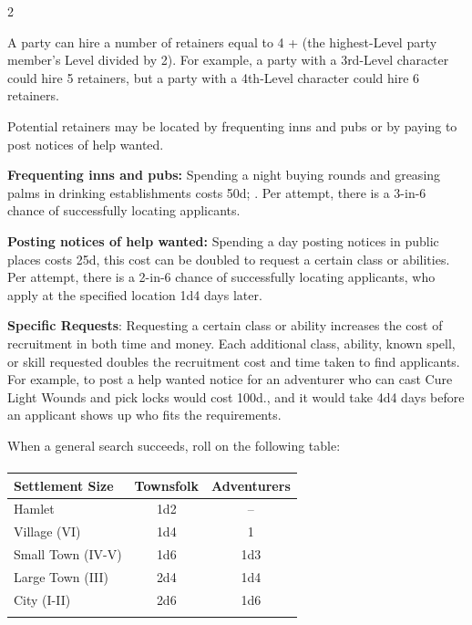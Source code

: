 \documentclass{book}
\begin{document}
\begin{multicols}{2}

A party can hire a number of retainers equal to 4 + (the highest-Level
party member's Level divided by 2). For example, a party with a
3rd-Level character could hire 5 retainers, but a party with a 4th-Level
character could hire 6 retainers.

Potential retainers may be located by frequenting inns and pubs or by
paying to post notices of help wanted.

\textbf{Frequenting inns and pubs:} Spending a night buying rounds and
greasing palms in drinking establishments costs 50d; . Per attempt,
there is a 3-in-6 chance of successfully locating applicants.

\textbf{Posting notices of help wanted:} Spending a day posting notices
in public places costs 25d, this cost can be doubled to request a
certain class or abilities. Per attempt, there is a 2-in-6 chance of
successfully locating applicants, who apply at the specified location
1d4 days later.

\textbf{Specific Requests}: Requesting a certain class or ability
increases the cost of recruitment in both time and money. Each
additional class, ability, known spell, or skill requested doubles the
recruitment cost and time taken to find applicants. For example, to post
a help wanted notice for an adventurer who can cast Cure Light Wounds
and pick locks would cost 100d., and it would take 4d4 days before an
applicant shows up who fits the requirements.

When a general search succeeds, roll on the following table:

\paragraph{}

\begin{table}[H]
	\centering
	\begin{tabular}[]{@{}lcc@{}}
		\toprule\noalign{}
			Settlement Size & Townsfolk & Adventurers \\
		\midrule\noalign{}
			Hamlet & 1d2 & -- \\
			Village (VI) & 1d4 & 1 \\
			Small Town (IV-V) & 1d6 & 1d3 \\
			Large Town (III) & 2d4 & 1d4 \\
			City (I-II) & 2d6 & 1d6 \\
		\bottomrule\noalign{}
	\end{tabular}
\end{table}


\end{multicols}
\end{document}
